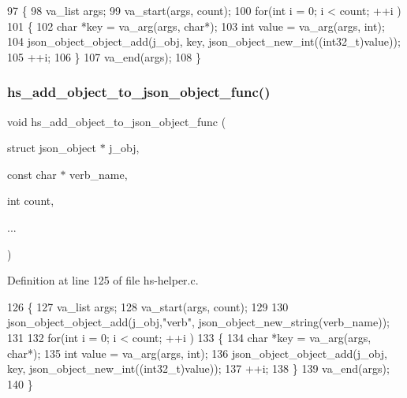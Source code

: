 \begin{DoxyCode}
97 \{
98     va\_list args;
99     va\_start(args, count);
100     \textcolor{keywordflow}{for}(\textcolor{keywordtype}{int} i = 0; i < count; ++i )
101     \{
102         \textcolor{keywordtype}{char} *key = va\_arg(args, \textcolor{keywordtype}{char}*);
103         \textcolor{keywordtype}{int} value = va\_arg(args, \textcolor{keywordtype}{int});
104         json\_object\_object\_add(j\_obj, key, json\_object\_new\_int((int32\_t)value));
105         ++i;
106     \}
107     va\_end(args);
108 \}
\end{DoxyCode}
\mbox{\label{hs-helper_8h_ae83604a37134e7bdee3ce4f10bb0b47a}} 
\subsubsection{\texorpdfstring{hs\+\_\+add\+\_\+object\+\_\+to\+\_\+json\+\_\+object\+\_\+func()}{hs\_add\_object\_to\_json\_object\_func()}}
{\footnotesize\ttfamily void hs\+\_\+add\+\_\+object\+\_\+to\+\_\+json\+\_\+object\+\_\+func (\begin{DoxyParamCaption}\item[{struct json\+\_\+object $\ast$}]{j\+\_\+obj,  }\item[{const char $\ast$}]{verb\+\_\+name,  }\item[{int}]{count,  }\item[{}]{... }\end{DoxyParamCaption})}



Definition at line 125 of file hs-\/helper.\+c.


\begin{DoxyCode}
126 \{
127     va\_list args;
128     va\_start(args, count);
129 
130     json\_object\_object\_add(j\_obj,\textcolor{stringliteral}{"verb"}, json\_object\_new\_string(verb\_name));
131 
132     \textcolor{keywordflow}{for}(\textcolor{keywordtype}{int} i = 0; i < count; ++i )
133     \{
134         \textcolor{keywordtype}{char} *key = va\_arg(args, \textcolor{keywordtype}{char}*);
135         \textcolor{keywordtype}{int} value = va\_arg(args, \textcolor{keywordtype}{int});
136         json\_object\_object\_add(j\_obj, key, json\_object\_new\_int((int32\_t)value));
137         ++i;
138     \}
139     va\_end(args);
140 \}
\end{DoxyCode}
\mbox{\label{hs-helper_8h_a8777c53f1d4d5412f19b134ad85ffedf}} 
